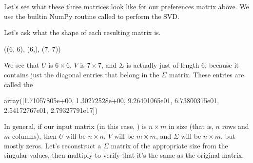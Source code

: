 \documentclass[letterpaper,10pt,english]{jupyterBook}
\begin{document}
\sphinxAtStartPar
Let’s see what these three matrices look like for our preferences matrix above.  We use the built\sphinxhyphen{}in NumPy routine called  to perform the SVD.

\begin{sphinxVerbatim}[commandchars=\\\{\}]
      
\end{sphinxVerbatim}

\sphinxAtStartPar
Let’s ask what the shape of each resulting matrix is.

\begin{sphinxVerbatim}[commandchars=\\\{\}]
  
\end{sphinxVerbatim}

\begin{sphinxVerbatim}[commandchars=\\\{\}]
((6, 6), (6,), (7, 7))
\end{sphinxVerbatim}

\sphinxAtStartPar
We see that \(U\) is \(6\times6\), \(V\) is \(7\times 7\), and \(\Sigma\) is actually just of length 6, because it contains just the diagonal entries that belong in the \(\Sigma\) matrix.  These entries are called the 

\begin{sphinxVerbatim}[commandchars=\\\{\}]
\end{sphinxVerbatim}

\begin{sphinxVerbatim}[commandchars=\\\{\}]
array([1.71057805e+00, 1.30272528e+00, 9.26401065e\PYGZhy{}01, 6.73800315e\PYGZhy{}01,
       2.54172767e\PYGZhy{}01, 2.79327791e\PYGZhy{}17])
\end{sphinxVerbatim}

\sphinxAtStartPar
In general, if our input matrix (in this case, ) is \(n\times m\) in size (that is, \(n\) rows and \(m\) columns), then \(U\) will be \(n\times n\), \(V\) will be \(m\times m\), and \(\Sigma\) will be \(n\times m\), but mostly zeros.  Let’s reconstruct a \(\Sigma\) matrix of the appropriate size from the singular values, then multiply  to verify that it’s the same as the original  matrix.
\end{document}

